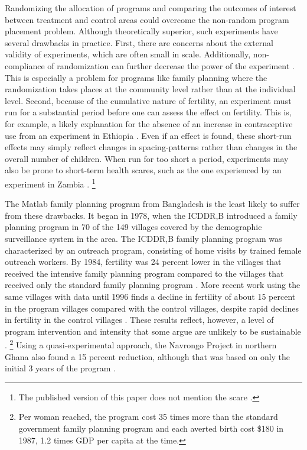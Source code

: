 \documentclass[letterpaper,12pt]{article}
\begin{document}
Randomizing the allocation of programs and comparing the outcomes of
interest between treatment and control areas could overcome the
non-random program placement problem.
Although theoretically superior, such experiments have several drawbacks
in practice.
First, there are concerns about the external validity of experiments,
which are often small in scale.
Additionally, non-compliance of randomization can further decrease the
power of the experiment \citep{Desai2011}.
This is especially a problem for programs like family planning where the
randomization takes places at the community level rather than at the
individual level.
Second, because of the cumulative nature of fertility, an experiment
must run for a substantial period before one can assess the effect on
fertility.
This is, for example, a likely explanation for the absence of an
increase in contraceptive use from an experiment in Ethiopia
\citep{Desai2011}.
Even if an effect is found, these short-run effects may simply reflect
changes in spacing-patterns rather than changes in the overall number of
children.
When run for too short a period, experiments may also be prone to
short-term health scares, such as the one experienced by an experiment
in Zambia \citep{Ashraf2009}.%
\footnote{
The published version of this paper does not mention the scare
\citep{Ashraf2014}.}

The Matlab family planning program from Bangladesh is the least likely
to suffer from these drawbacks.
It began in 1978, when the ICDDR,B introduced a family planning program
in 70 of the 149 villages covered by the demographic surveillance system
in the area.
The ICDDR,B family planning program was characterized by an outreach
program, consisting of home visits by trained female outreach workers.
By 1984, fertility was 24 percent lower in the villages that received
the intensive family planning program compared to the villages that
received only the standard family planning program \citep{Phillips1988}.
More recent work using the same villages with data until 1996 finds a
decline in fertility of about 15 percent in the program villages
compared with the control villages, despite rapid declines in fertility
in the control villages \citep{Sinha2005,Joshi2007}.
These results reflect, however, a level of program intervention and
intensity that some argue are unlikely to be sustainable
\citep{pritchett94a}.%
\footnote{
Per woman reached, the program cost 35 times more than the standard
government family planning program and each averted birth cost \$180 in
1987, 1.2 times GDP per capita at the time.}
Using a quasi-experimental approach, the Navrongo Project in northern
Ghana also found a 15 percent reduction, although that was based on only
the initial 3 years of the program \citep{Debpuur2002}.
\end{document}
